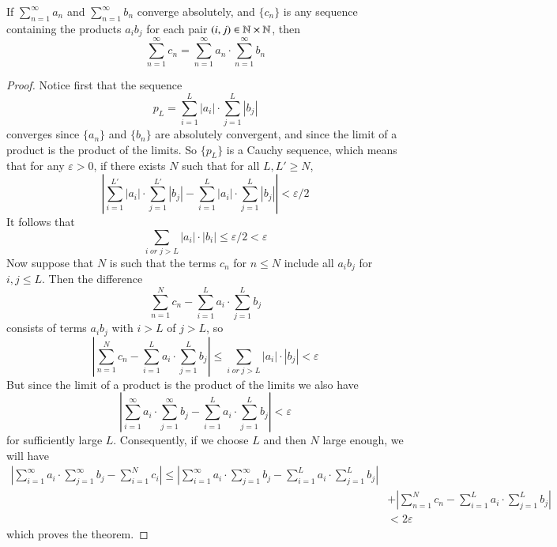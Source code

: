 \documentclass[12pt, a4paper, oneside, openright, titlepage]{book}
\begin{document}
\begin{thm}
    If $\sum\limits_{n=1}^{\infty}a_n$ and $\sum\limits_{n=1}^{\infty}b_n$ converge absolutely, and $\{c_n\}$ is any sequence containing the products $a_ib_j$ for each pair $(i,j) \in \mathbb N\times \mathbb N$, then \begin{equation*}
        \sum\limits_{n=1}^{\infty}c_n = \sum\limits_{n=1}^{\infty}a_n\cdot\sum\limits_{n=1}^{\infty}b_n
    \end{equation*}
\end{thm}
\begin{proof}
    Notice first that the sequence \begin{equation*}
        p_L = \sum\limits_{i=1}^L|a_i|\cdot \sum\limits_{j=1}^L|b_j|
    \end{equation*}
    converges since $\{a_n\}$ and $\{b_n\}$ are absolutely convergent, and since the limit of a product is the product of the limits. So $\{p_L\}$ is a Cauchy sequence, which means that for any $\varepsilon > 0$, if there exists $N$ such that for all $L,L' \geq N$, \begin{equation*}
        \left|\sum\limits_{i=1}^{L'}|a_i|\cdot \sum\limits_{j=1}^{L'}|b_j| - \sum\limits_{i=1}^L|a_i|\cdot \sum\limits_{j=1}^L|b_j|\right| < \varepsilon/2
    \end{equation*}
    It follows that \begin{equation*}
        \sum\limits_{i\;or\;j > L} |a_i|\cdot|b_i| \leq \varepsilon/2 < \varepsilon \tag{1}
    \end{equation*}
    Now suppose that $N$ is such that the terms $c_n$ for $n \leq N$ include all $a_ib_j$ for $i,j \leq L$. Then the difference \begin{equation*}
        \sum\limits_{n=1}^Nc_n - \sum\limits_{i=1}^La_i\cdot \sum\limits_{j=1}^Lb_j
    \end{equation*}
    consists of terms $a_ib_j$ with $i > L$ of $j > L$, so \begin{equation*}
        \left|\sum\limits_{n=1}^Nc_n - \sum\limits_{i=1}^La_i\cdot \sum\limits_{j=1}^Lb_j\right| \leq \sum\limits_{i\;or\;j>L}|a_i|\cdot|b_j| < \varepsilon \tag{2}
    \end{equation*}
    But since the limit of a product is the product of the limits we also have \begin{equation*}
        \left|\sum\limits_{i=1}^{\infty}a_i\cdot \sum\limits_{j=1}^{\infty}b_j - \sum\limits_{i=1}^La_i\cdot \sum\limits_{j=1}^Lb_j\right| < \varepsilon \tag{3}
    \end{equation*}
    for sufficiently large $L$. Consequently, if we choose $L$ and then $N$ large enough, we will have \begin{align*}
        \left|\sum\limits_{i=1}^{\infty}a_i\cdot \sum\limits_{j=1}^{\infty}b_j - \sum\limits_{i=1}^Nc_i\right| \leq \left|\sum\limits_{i=1}^{\infty}a_i\cdot \sum\limits_{j=1}^{\infty}b_j - \sum\limits_{i=1}^La_i\cdot \sum\limits_{j=1}^Lb_j\right| \\
        &+ \left|\sum\limits_{n=1}^Nc_n - \sum\limits_{i=1}^La_i\cdot \sum\limits_{j=1}^Lb_j\right| \\
        &< 2\varepsilon
    \end{align*}
    which proves the theorem.
\end{proof}
\end{document}
